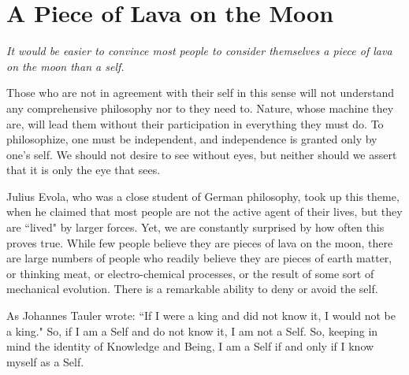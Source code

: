 \section{A Piece of Lava on the Moon}

\begin{quotex}
\emph{It would be easier to convince most people to consider themselves a piece of lava on the moon than a self.}

Those who are not in agreement with their self in this sense will not understand any comprehensive philosophy nor to they need to. Nature, whose machine they are, will lead them without their participation in everything they must do. To philosophize, one must be independent, and independence is granted only by one's self. We should not desire to see without eyes, but neither should we assert that it is only the eye that sees.

\end{quotex}

Julius Evola, who was a close student of German philosophy, took up this theme, when he claimed that most people are not the active agent of their lives, but they are ``lived" by larger forces. Yet, we are constantly surprised by how often this proves true. While few people believe they are pieces of lava on the moon, there are large numbers of people who readily believe they are pieces of earth matter, or thinking meat, or electro-chemical processes, or the result of some sort of mechanical evolution. There is a remarkable ability to deny or avoid the self. 

As Johannes Tauler wrote: ``If I were a king and did not know it, I would not be a king." So, if I am a Self and do not know it, I am not a Self. So, keeping in mind the identity of Knowledge and Being, I am a Self if and only if I know myself as a Self.



